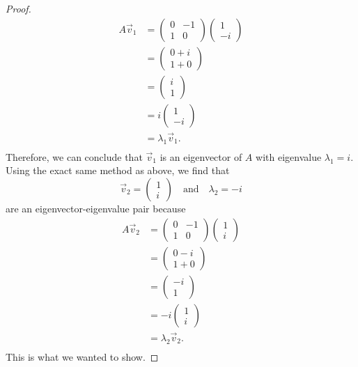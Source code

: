 \documentclass{article}
\begin{document}
\begin{proof}
\begin{align*}
A \vec{v}_1 &= \begin{pmatrix}0&-1\\1&0\end{pmatrix} \begin{pmatrix}1\\-i\end{pmatrix}\\
&= \begin{pmatrix}0 + i\\1 + 0\end{pmatrix}\\
& = \begin{pmatrix}i\\1\end{pmatrix}\\
& = i \begin{pmatrix}1\\-i\end{pmatrix}\\ 
& = \lambda_1 \vec{v}_1.\\ 
\end{align*}
Therefore, we can conclude that $\vec{v}_1$ is an eigenvector of $A$ with eigenvalue $\lambda_1 = i$. Using the exact same method as above, we find that $$\vec{v}_2 = \begin{pmatrix}1\\i \end{pmatrix} \quad \text{and} \quad \lambda_2 = -i$$ are an eigenvector-eigenvalue pair because
\begin{align*}
A \vec{v}_2 &= \begin{pmatrix}0&-1\\1&0\end{pmatrix} \begin{pmatrix}1\\i\end{pmatrix}\\
&= \begin{pmatrix}0 - i\\1 + 0\end{pmatrix}\\
&= \begin{pmatrix}-i\\1\end{pmatrix}\\
& = -i \begin{pmatrix}1\\i\end{pmatrix}\\ 
& = \lambda_2 \vec{v}_2.\\ 
\end{align*}
This is what we wanted to show.
\end{proof}
\end{document}
